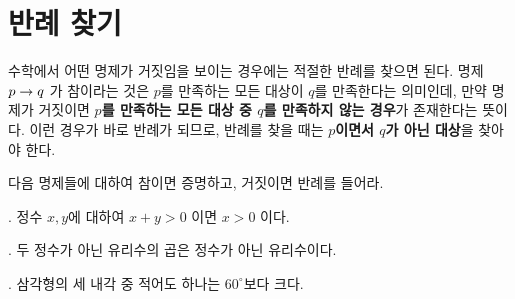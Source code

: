 \section{반례 찾기}

수학에서 어떤 명제가 거짓임을 보이는 경우에는 적절한 반례를 찾으면 된다. 명제 \(p \rightarrow q\) 가 참이라는 것은 \(p\)를 만족하는 모든 대상이 \(q\)를 만족한다는 의미인데, 만약 명제가 거짓이면 \textbf{\(p\)를 만족하는 모든 대상 중 \(q\)를 만족하지 않는 경우}가 존재한다는 뜻이다. 이런 경우가 바로 반례가 되므로, 반례를 찾을 때는 \textbf{\(p\)이면서 \(q\)가 아닌 대상}을 찾아야 한다.

\bigskip

다음 명제들에 대하여 참이면 증명하고, 거짓이면 반례를 들어라.

\ex. 정수 \(x, y\)에 대하여 \(x + y > 0\) 이면 \(x > 0\) 이다.

\vspace*{120px}

\ex. 두 정수가 아닌 유리수의 곱은 정수가 아닌 유리수이다.

\vspace*{120px}

\ex. 삼각형의 세 내각 중 적어도 하나는 \(60^\circ\)보다 크다.

\pagebreak
